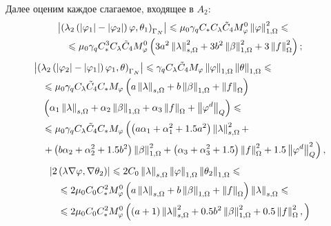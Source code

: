 Далее оценим каждое слагаемое, входящее в $A_2$:
\begin{equation}
	\begin{split}
		&\left\vert 
			\left( 
				\lambda_2 
				\left( \left\vert \varphi_1 \right\vert - \left\vert \varphi_2 \right\vert
			 \right) 
			\varphi, \theta_1
		 \right)_{\Gamma_N} \right\vert 
		\leqslant 
			\mu_0 \gamma_q 
			C_{*} C_\lambda \tilde C_4 
			M_\varphi^0 
			\left\Vert \varphi \right\Vert^2_{1,\Omega} 
		\leqslant \\
		&\quad\leqslant 
			\mu_0 \gamma_q 
			C_{*}^3 C_\lambda \tilde C_4 
			M_\varphi^0
			\left( 
				3a^2 
				\left\Vert \lambda \right\Vert_{s,\Omega}^2 
				+ 3 b^2 
				\left\Vert \beta \right\Vert_{1,\Omega}^2 
				+ 3 \left\Vert f \right\Vert_\Omega^2
			 \right);
	\end{split}
\end{equation}
\begin{equation}
	\begin{split}
		&\left\vert 
			\left( 
				\lambda_2 
				\left( \left\vert \varphi_2 \right\vert - \left\vert \varphi_1 \right\vert \right) 
				\varphi_1, \theta
			 \right)_{\Gamma_N}
		 \right\vert 
		\leqslant
			\gamma_q 
			C_\lambda \tilde C_4
			M_\varphi 
			\left\Vert \varphi \right\Vert_{1,\Omega} 
			\left\Vert \theta \right\Vert_{1,\Omega} 
		\leqslant \\
		&\quad\leqslant 
			\mu_0 \gamma_q 
			C_\lambda \tilde C_4 C_{*} 
			M_\varphi   
			\left(  
				a \left\Vert \lambda \right\Vert_{s,\Omega}
				+ b \left\Vert \beta \right\Vert_{1,\Omega} 
				+ \left\Vert f \right\Vert_\Omega 
			 \right) \\
			&\quad \left( 
				\alpha_1 \left\Vert \lambda \right\Vert_{s,\Omega} 
				+ \alpha_2 \left\Vert \beta \right\Vert_{1,\Omega} 
				+ \alpha_3 \left\Vert f \right\Vert_\Omega 
				+ \left\Vert \varphi^d \right\Vert_Q
			 \right)  
		\leqslant \\
		&\quad\leqslant 
			\mu_0 \gamma_q 
			C_\lambda \tilde C_4 C_{*}
			M_\varphi   
			\left(  
				\left( 
					a \alpha_1 
					+ \alpha_1^2 
					+ 1.5 a^2
				 \right)
				\left\Vert \lambda \right\Vert_{s,\Omega}^2 + \right. \\
				&\quad\left. + \left( 
					b \alpha_2 
					+ \alpha_2^2 
					+ 1.5 b^2 
				 \right)
				\left\Vert \beta \right\Vert_{1,\Omega}^2 
				+ \left( 
					\alpha_3 
					+ \alpha_3^2
					+ 1.5
				 \right)
				\left\Vert f \right\Vert_\Omega^2
				+ 1.5
				\left\Vert \varphi^d \right\Vert_Q ^2 
			 \right),
	\end{split}
\end{equation}
\begin{equation}
	\begin{split}
		&\left\vert  
			2 \left(  \lambda \nabla \varphi, \nabla \theta_2  \right)
		 \right\vert \leqslant 
			2 C_0
			\left\Vert \lambda \right\Vert_{s,\Omega} 
			\left\Vert \varphi \right\Vert_{1,\Omega} 
			\left\Vert \theta_2 \right\Vert_{1,\Omega} 
		\leqslant \\
		&\quad\leqslant 
			2 \mu_0 
			C_0 C_{*}^2 
			M_\varphi^0
			\left(  
				a \left\Vert \lambda \right\Vert_{s,\Omega}
				+ b \left\Vert \beta \right\Vert_{1,\Omega} 
				+ \left\Vert f \right\Vert_\Omega 
			 \right) 
			\left\Vert \lambda \right\Vert_{s,\Omega} 
		\leqslant \\
		&\quad\leqslant 
			2 \mu_0 
			C_0 C_{*}^2 
			M_\varphi^0 
			\left( 
				(a + 1) 
				\left\Vert \lambda \right\Vert_{s,\Omega}^2 
				+ 0.5 b^2 
				\left\Vert \beta \right\Vert_{1,\Omega}^2 
				+ 0.5 
				\left\Vert f \right\Vert_\Omega^2,
			 \right) 
	\end{split}
\end{equation}
